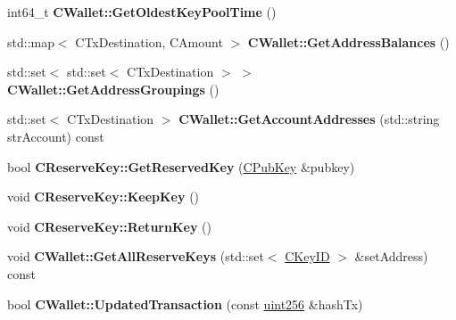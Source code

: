 \begin{DoxyCompactItemize}
\item 
\mbox{\label{group___actions_ga2555a9442e58b3c5593fef21f1b39d2d}} 
int64\+\_\+t {\bfseries C\+Wallet\+::\+Get\+Oldest\+Key\+Pool\+Time} ()
\item 
\mbox{\label{group___actions_gadf2b4ac337ddb271555985cec82e43e6}} 
std\+::map$<$ C\+Tx\+Destination, C\+Amount $>$ {\bfseries C\+Wallet\+::\+Get\+Address\+Balances} ()
\item 
\mbox{\label{group___actions_ga8eacbac6ad3697d90b98dfe02632f8ef}} 
std\+::set$<$ std\+::set$<$ C\+Tx\+Destination $>$ $>$ {\bfseries C\+Wallet\+::\+Get\+Address\+Groupings} ()
\item 
\mbox{\label{group___actions_ga5ed156a58e65961f9edebd8105f36cdc}} 
std\+::set$<$ C\+Tx\+Destination $>$ {\bfseries C\+Wallet\+::\+Get\+Account\+Addresses} (std\+::string str\+Account) const
\item 
\mbox{\label{group___actions_gad198d2d7a54d315c60805ba1cb0caf7c}} 
bool {\bfseries C\+Reserve\+Key\+::\+Get\+Reserved\+Key} (\mbox{\hyperlink{class_c_pub_key}{C\+Pub\+Key}} \&pubkey)
\item 
\mbox{\label{group___actions_ga493d06f41ca9571f2a42c8581a3952d8}} 
void {\bfseries C\+Reserve\+Key\+::\+Keep\+Key} ()
\item 
\mbox{\label{group___actions_gaf7b0a61f8c70c8146e42e82b4e227204}} 
void {\bfseries C\+Reserve\+Key\+::\+Return\+Key} ()
\item 
\mbox{\label{group___actions_gaa182f6de943295062748ab42e64c9203}} 
void {\bfseries C\+Wallet\+::\+Get\+All\+Reserve\+Keys} (std\+::set$<$ \mbox{\hyperlink{class_c_key_i_d}{C\+Key\+ID}} $>$ \&set\+Address) const
\item 
\mbox{\label{group___actions_ga96a5b2321f27270c5959bc697cca9c9a}} 
bool {\bfseries C\+Wallet\+::\+Updated\+Transaction} (const \mbox{\hyperlink{classuint256}{uint256}} \&hash\+Tx)
\item 
\mbox{\label{group___actions_ga2be3aa26d84c79bdcabb41c6b3fe0e0f}} 

\end{DoxyCompactItemize}

